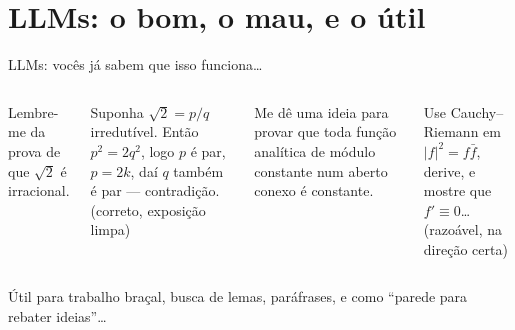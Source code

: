 \documentclass[10pt,aspectratio=169]{beamer}
\newcommand{\fade}[1]{{\color{fgmute}#1}}
\begin{document}
\section{LLMs: o bom, o mau, e o útil}

\begin{frame}{LLMs: vocês já sabem que isso funciona\ldots}
  \begin{columns}[T,onlytextwidth]
    \begin{userbox}
      \small Lembre-me da prova de que $\sqrt{2}$ é irracional.
    \end{userbox}
    \vspace{0.6em}
    \begin{llmbox}
      \small Suponha $\sqrt2 = p/q$ irredutível. Então $p^2 = 2q^2$,
      logo $p$ é par, $p=2k$, daí $q$ também é par --- contradição.\\
      \fade{(correto, exposição limpa)}
    \end{llmbox}
    \pause

    \begin{userbox}
      \small Me dê uma ideia para provar que toda função analítica de módulo constante num aberto conexo é constante.
    \end{userbox}
    \vspace{0.6em}
    \begin{llmbox}
      \small Use Cauchy--Riemann em $|f|^2 = f\bar f$, derive, e mostre que $f' \equiv 0$\ldots\\
      \fade{(razoável, na direção certa)}
    \end{llmbox}
  \end{columns}
  \vfill
  \pause
  \begin{center}\color{fgmute}\small
    Útil para trabalho braçal, busca de lemas, paráfrases, e como
    ``parede para rebater ideias''\ldots
  \end{center}
\end{frame}
\end{document}
